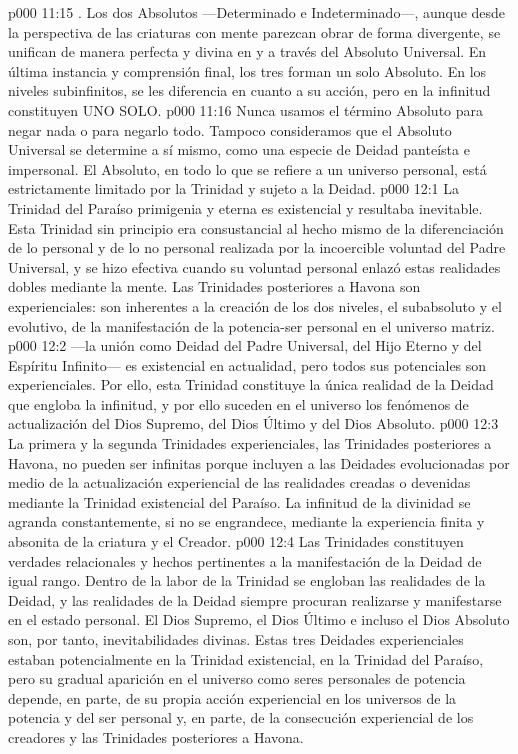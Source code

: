 \vs p000 11:15 \pc {}. Los dos Absolutos ---Determinado e Indeterminado---, aunque desde la perspectiva de las criaturas con mente parezcan obrar de forma divergente, se unifican de manera perfecta y divina en y a través del Absoluto Universal. En última instancia y comprensión final, los tres forman un solo Absoluto. En los niveles subinfinitos, se les diferencia en cuanto a su acción, pero en la infinitud constituyen UNO SOLO.
\vs p000 11:16 \pc Nunca usamos el término Absoluto para negar nada o para negarlo todo. Tampoco consideramos que el Absoluto Universal se determine a sí mismo, como una especie de Deidad panteísta e impersonal. El Absoluto, en todo lo que se refiere a un universo personal, está estrictamente limitado por la Trinidad y sujeto a la Deidad.
\vs p000 12:1 La Trinidad del Paraíso primigenia y eterna es existencial y resultaba inevitable. Esta Trinidad sin principio era consustancial al hecho mismo de la diferenciación de lo personal y de lo no personal realizada por la incoercible voluntad del Padre Universal, y se hizo efectiva cuando su voluntad personal enlazó estas realidades dobles mediante la mente. Las Trinidades posteriores a Havona son experienciales: son inherentes a la creación de los dos niveles, el subabsoluto y el evolutivo, de la manifestación de la potencia\hyp{}ser personal en el universo matriz.
\vs p000 12:2 \pc {} ---la unión como Deidad del Padre Universal, del Hijo Eterno y del Espíritu Infinito--- es existencial en actualidad, pero todos sus potenciales son experienciales. Por ello, esta Trinidad constituye la única realidad de la Deidad que engloba la infinitud, y por ello suceden en el universo los fenómenos de actualización del Dios Supremo, del Dios Último y del Dios Absoluto.
\vs p000 12:3 \pc La primera y la segunda Trinidades experienciales, las Trinidades posteriores a Havona, no pueden ser infinitas porque incluyen a las  Deidades evolucionadas por medio de la actualización experiencial de las realidades creadas o devenidas mediante la Trinidad existencial del Paraíso. La infinitud de la divinidad se agranda constantemente, si no se engrandece, mediante la experiencia finita y absonita de la criatura y el Creador.
\vs p000 12:4 Las Trinidades constituyen verdades relacionales y hechos pertinentes a la manifestación de la Deidad de igual rango. Dentro de la labor de la Trinidad se engloban las realidades de la Deidad, y las realidades de la Deidad siempre procuran realizarse y manifestarse en el estado personal. El Dios Supremo, el Dios Último e incluso el Dios Absoluto son, por tanto, inevitabilidades divinas. Estas tres Deidades experienciales estaban potencialmente en la Trinidad existencial, en la Trinidad del Paraíso, pero su gradual aparición en el universo como seres personales de potencia depende, en parte, de su propia acción experiencial en los universos de la potencia y del ser personal y, en parte, de la consecución experiencial de los creadores y las Trinidades posteriores a Havona.
